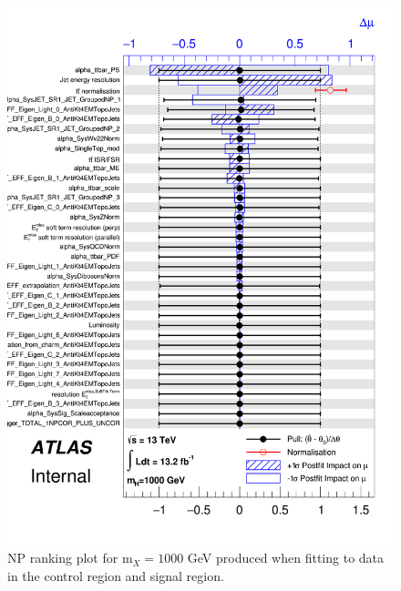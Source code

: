 \begin{figure}[hb]
\begin{center}
  \includegraphics[width=.75\textwidth]{chapters/dihiggs/figures/statFit_appendix/80009_260916-v3-observedPullPlots-x1000_HH_13TeV_260916-v3-observedPullPlots-x1000_Systs_1000_pulls_1000.png}
  \caption{NP ranking plot for m$_X = 1000$ GeV produced when fitting to data in the control region and signal region.}
  \label{fig:npRanking_1000}
\end{center}    
\end{figure}

  
\clearpage
